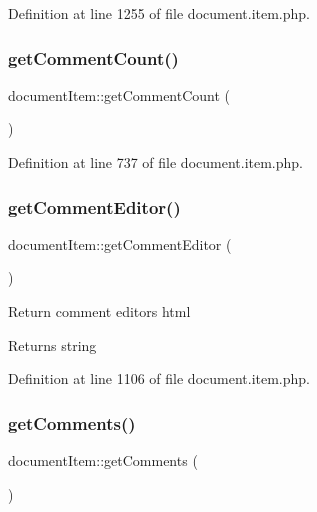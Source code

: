 Definition at line 1255 of file document.\+item.\+php.

\mbox{\label{classdocumentItem_a9ed429fc56e6f95ef097645c772aa4e5}} 
\subsubsection{\texorpdfstring{get\+Comment\+Count()}{getCommentCount()}}
{\footnotesize\ttfamily document\+Item\+::get\+Comment\+Count (\begin{DoxyParamCaption}{ }\end{DoxyParamCaption})}



Definition at line 737 of file document.\+item.\+php.

\mbox{\label{classdocumentItem_a59ef94b52cf1a250aa4f29990e8d376d}} 
\subsubsection{\texorpdfstring{get\+Comment\+Editor()}{getCommentEditor()}}
{\footnotesize\ttfamily document\+Item\+::get\+Comment\+Editor (\begin{DoxyParamCaption}{ }\end{DoxyParamCaption})}

Return comment editor\textquotesingle{}s html \begin{DoxyReturn}{Returns}
string 
\end{DoxyReturn}


Definition at line 1106 of file document.\+item.\+php.

\mbox{\label{classdocumentItem_ad85b3da641f8bd477963d7290383e6be}} 
\subsubsection{\texorpdfstring{get\+Comments()}{getComments()}}
{\footnotesize\ttfamily document\+Item\+::get\+Comments (\begin{DoxyParamCaption}{ }\end{DoxyParamCaption})}



